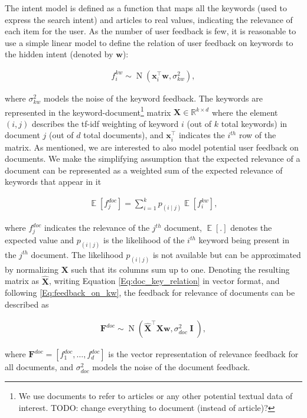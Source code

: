 \documentclass[dissertation,math,vertlayout,pdfa,colorlinks]{aaltoseries}
\newcommand{\bw}{\bm{w}}
\DeclareMathOperator{\eye}{\textbf{I}}
\DeclareMathOperator{\normalpdf}{N}
\DeclareMathOperator{\E}{\mathbb{E}}
\newcommand{\tp}{^{\top}}
\begin{document}
The intent model is defined as a function that maps all the keywords (used to express the search intent) and articles to real values, indicating the relevance of each item for the user. As the number of user feedback is few, it is reasonable to use a simple linear model to define the relation of user feedback on keywords to the hidden intent (denoted by $\bw$):

\begin{align}\label{Eq:feedback_on_kw} 
f_{i}^{kw} \sim \normalpdf(\bm{x}_i\tp \bw, \sigma_{kw}^2), 
\end{align}

\noindent where $\sigma_{kw}^2$ models the noise of the keyword feedback. The keywords are represented in the keyword-document\footnote{We use documents to refer to articles or any other potential textual data of interest. TODO: change everything to document (instead of article)?} matrix $\bm{X} \in \mathbb{R}^{k \times d}$ where the element $(i,j)$ describes the tf-idf weighting of keyword $i$ (out of $k$ total keywords) in document $j$ (out of $d$ total documents), and $\bm{x}_i\tp$ indicates the $i^{th}$ row of the matrix. As mentioned, we are interested to also model potential user feedback on documents. We make the simplifying assumption that the expected relevance of a document can be represented as a weighted sum of the expected relevance of keywords that appear in it

\begin{align}\label{Eq:doc_key_relation} 
 \E[f_{j}^{doc}] = \sum_{i=1}^{k} p_{(i \mid j)}  \E[f_{i}^{kw}],
\end{align}

\noindent where $f_{j}^{doc}$ indicates the relevance of the $j^{th}$ document, $\E[.]$ denotes the expected value and $p_{(i \mid j)}$ is the likelihood of the $i^{th}$ keyword being present in the $j^{th}$ document. The likelihood $p_{(i \mid j)}$ is not available but can be approximated by normalizing $\bm{X}$ such that its columns sum up to one. Denoting the resulting matrix as $\hat{\bm{X}}$, writing Equation \ref{Eq:doc_key_relation} in vector format, and following  \ref{Eq:feedback_on_kw}, the feedback for relevance of documents can be described as 

\begin{align}\label{Eq:doc_key_relation_vector} 
\bm{F}^{doc} \sim \normalpdf(  \hat{\bm{X}}\tp \bm{X} \bw, \sigma_{doc}^2 \eye),
\end{align}  

\noindent where $\bm{F}^{doc}=[f_{1}^{doc},\ldots,f_{d}^{doc}]$ is the vector representation of relevance feedback for all documents, and $\sigma_{doc}^2$ models the noise of the document feedback. 
\end{document}
